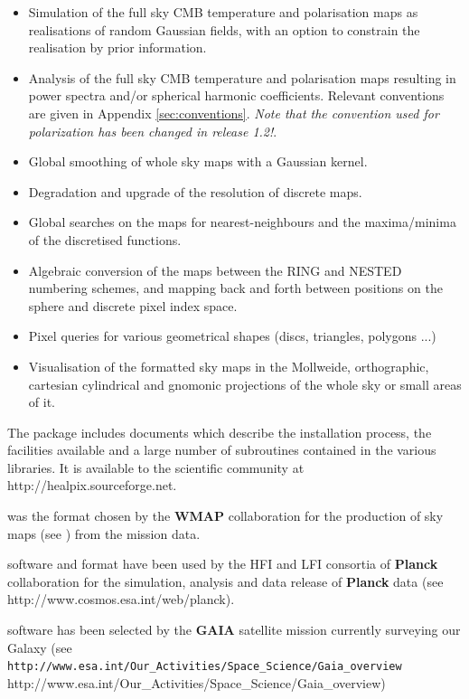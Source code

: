\documentclass[12pt,twoside]{article}
\newcommand{\healpixwebpage}{http://healpix.sourceforge.net}
\begin{document}
\begin{itemize}
\item Simulation of the full sky CMB temperature and polarisation maps
as realisations of random Gaussian fields, with an option to constrain
the realisation by prior information.
\item Analysis of the full sky CMB temperature and polarisation maps
resulting in power spectra and/or spherical harmonic
coefficients. Relevant conventions are given in Appendix \ref{sec:conventions}.
{\large {\em Note that the convention used for polarization has been changed in
release 1.2!}}.
\item Global smoothing of whole sky maps with a Gaussian kernel.
\item Degradation and upgrade of the resolution of discrete maps.
\item Global searches on the maps for nearest-neighbours and 
the maxima/minima of the discretised functions.
\item Algebraic conversion of the maps between the RING and NESTED numbering
schemes, and mapping back and forth between  positions on the sphere and 
discrete pixel index space.
\item Pixel queries for various geometrical shapes (discs, triangles, polygons ...)
\item Visualisation of the \healpix formatted sky maps in the
Mollweide, orthographic, cartesian cylindrical and gnomonic
projections of the whole sky or small areas of it. 
\end{itemize}

The package includes documents which describe the installation
process, the facilities available and a large number of 
subroutines contained in the various libraries. It is
available to the scientific community  at \htmladdnormallink{\texttt{\healpixwebpage}}
{\healpixwebpage}.

\healpix was the format chosen by the \textbf{WMAP}
collaboration 
for the production
of sky maps (see 
)
 from the mission data. 

\healpix software and format have been used by the HFI and LFI consortia of \textbf{Planck}
collaboration for the simulation, analysis and data release of \textbf{Planck} data
(see %
{http://www.cosmos.esa.int/web/planck}).

\healpix software has been selected by the \textbf{GAIA} satellite mission currently surveying our Galaxy
(see 
\htmladdnormallink%
{\texttt{http://www.esa.int/Our\_\-Activities/Space\_\-Science/Gaia\_\-overview}}%
{http://www.esa.int/Our_Activities/Space_Science/Gaia_overview})
\end{document}
